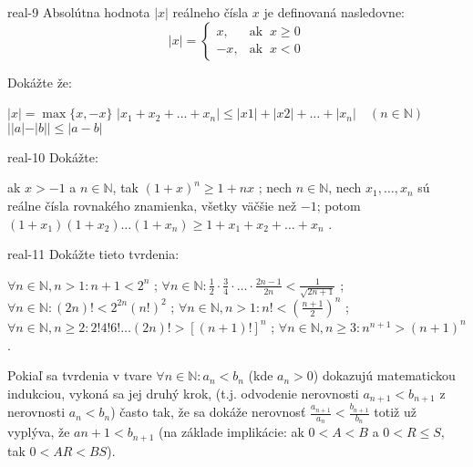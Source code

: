 \begin{defproblem}{real-9}
  Absolútna hodnota $|x|$ reálneho čísla $x$ je definovaná nasledovne:
  \[
    |x| =
      \begin{cases}
        x,  & \text{ak } ~x \geq 0 \\
        -x, & \text{ak } ~x < 0
      \end{cases}
  \]
  \begin{samepage}
  Dokážte že:
  \begin{tasks}
    \task $|x| = \max{\{x, -x\}}$
    \task $|x_1 + x_2 + \ldots + x_n| \leq |x1| + |x2| + \ldots + |x_n| \quad (n \in \mathbb{N})$
    \task $||a| - |b|| \leq |a - b|$
  \end{tasks}
  \end{samepage}
  \end{defproblem}

\begin{defproblem}{real-10}
Dokážte:

\begin{tasks}
  \task ak $x > -1$ a $n \in \mathbb{N}$, tak $(1 + x)^n \geq 1 + nx$ ;
  \task nech $n \in \mathbb{N}$, nech $x_1, \ldots, x_n$ sú reálne čísla
        rovnakého znamienka, všetky väčšie než $-1$; potom
        $(1 + x_1)(1 + x_2) \ldots (1 + x_n) \geq 1 + x_1 + x_2 + \ldots + x_n$ .
\end{tasks}
\end{defproblem}

\begin{defproblem}{real-11}
Dokážte tieto tvrdenia:

\begin{tasks}
  \task $\forall n \in \mathbb{N}, n > 1: n + 1 < 2^n$ ;
  \task $\forall n \in \mathbb{N}: \frac{1}{2} \cdot \frac{3}{4} \cdot \ldots
          \cdot \frac{2n - 1}{2n} < \frac{1}{\sqrt{2n + 1}}$ ;
  \task $\forall n \in \mathbb{N}: (2n)! < 2^{2n} (n!)^2$ ;
  \task $\forall n \in \mathbb{N}, n > 1: n! < (\frac{n + 1}{2})^n$ ;
  \task $\forall n \in \mathbb{N}, n \geq 2: 2! 4! 6! \ldots (2n)!
          > [(n+1)!]^n$ ;
  \task $\forall n \in \mathbb{N}, n \geq 3: n^{n+1} > (n+1)^n$ .
\end{tasks}

\begin{solution}
Pokiaľ sa tvrdenia v tvare $\forall n \in \mathbb{N}: a_n < b_n$ (kde $a_n > 0$)
dokazujú matematickou indukciou, vykoná sa jej druhý krok, (t.j. odvodenie
nerovnosti $a_{n+1} < b_{n+1}$ z nerovnosti $a_n < b_n$) často tak, že sa dokáže
nerovnosť $\frac{a_{n + 1}}{a_n} < \frac{b_{n + 1}}{b_n}$ totiž už vyplýva, že
$a{n + 1} < b_{n+1}$ (na základe implikácie: ak $0 < A < B$ a $0 < R \leq S$,
tak  $0 < AR < BS$).
\end{solution}
\end{defproblem}

